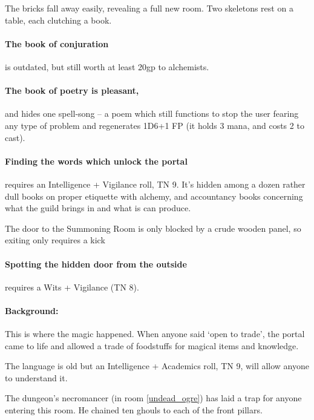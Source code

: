\begin{multicols}{2}
\begin{boxtext}
  The bricks fall away easily, revealing a full new room.  Two skeletons rest on a table, each clutching a book.

\end{boxtext}

\paragraph{The book of conjuration}
is outdated, but still worth at least 20gp to \gls{alchemists}.

\paragraph{The book of poetry is pleasant,}
and hides one spell-song -- a poem which still functions to stop the user fearing any type of problem and regenerates 1D6+1 FP (it holds 3 mana, and costs 2 to cast).

\paragraph{Finding the words which unlock the portal}
requires an Intelligence + Vigilance roll, TN 9.
It's hidden among a dozen rather dull books on proper etiquette with alchemy, and accountancy books concerning what the guild brings in and what is can produce.

The door to the Summoning Room is only blocked by a crude wooden panel, so exiting only requires a kick

\paragraph{Spotting the hidden door from the outside}
requires a Wits + Vigilance (TN 8).

\label{summoningRoom}

\paragraph{Background:}
This is where the magic happened.
When anyone said `open to trade', the portal came to life and allowed a trade of foodstuffs for magical items and knowledge.

The language is old but an Intelligence + Academics roll, TN 9, will allow anyone to understand it.

The dungeon's necromancer (in room \ref{undead_ogre}) has laid a trap for anyone entering this room.
He chained ten ghouls to each of the front pillars.



\end{multicols}
